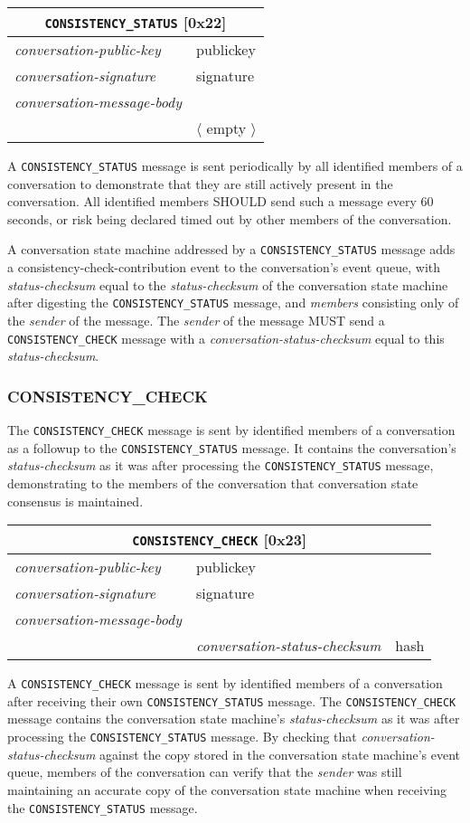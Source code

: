 \documentclass{article}
\def\message#1{\texttt{#1}}
\def\field#1{\textit{#1}}
\def\smfield#1{\textsl{#1}}
\def\type#1{\textsf{#1}}
\newenvironment{conversationmessage}[2]{
\newcommand{\messagefield}[2]{
& \field{##1} & \type{##2} \\
\hline
}
\hspace{2em minus 2em}\begin{tabular}{|l|l|l|}
\hline
\multicolumn{3}{|c|}{\message{#1} [#2]} \\
\hline
\hline
\field{conversation-public-key} & \multicolumn{2}{l|}{\type{publickey}} \\
\hline
\field{conversation-signature} & \multicolumn{2}{l|}{\type{signature}} \\
\hline
\field{conversation-message-body} & \multicolumn{2}{l|}{} \\
\hline
}{
\end{tabular}
}
\newcommand\emptyconversationmessage[2]{
\begin{conversationmessage}{#1}{#2}
& \multicolumn{2}{|l|}{ $\langle$ empty $\rangle$ } \\
\hline
\end{conversationmessage}
}
\begin{document}
\emptyconversationmessage{CONSISTENCY\_STATUS}{0x22}

A \message{CONSISTENCY\_STATUS} message is sent periodically by all identified members of a conversation to demonstrate that they are still actively present in the conversation.
All identified members SHOULD send such a message every 60 seconds, or risk being declared timed out by other members of the conversation.

A conversation state machine addressed by a \message{CONSISTENCY\_STATUS} message adds a \type{consistency-check-contribution} event to the conversation's event queue, with \smfield{status-checksum} equal to the \smfield{status-checksum} of the conversation state machine after digesting the \message{CONSISTENCY\_STATUS} message, and \smfield{members} consisting only of the \field{sender} of the message.
The \field{sender} of the message MUST send a \message{CONSISTENCY\_CHECK} message with a \field{conversation-status-checksum} equal to this \smfield{status-checksum}.


\subsubsection{CONSISTENCY\_CHECK}
\label{sec:messages/consistency-check}

The \message{CONSISTENCY\_CHECK} message is sent by identified members of a conversation as a followup to the \message{CONSISTENCY\_STATUS} message.
It contains the conversation's \smfield{status-checksum} as it was after processing the \message{CONSISTENCY\_STATUS} message, demonstrating to the members of the conversation that conversation state consensus is maintained.

\begin{conversationmessage}{CONSISTENCY\_CHECK}{0x23}
\messagefield{conversation-status-checksum}{hash}
\end{conversationmessage}

A \message{CONSISTENCY\_CHECK} message is sent by identified members of a conversation after receiving their own \message{CONSISTENCY\_STATUS} message.
The \message{CONSISTENCY\_CHECK} message contains the conversation state machine's \smfield{status-checksum} as it was after processing the \message{CONSISTENCY\_STATUS} message.
By checking that \field{conversation-status-checksum} against the copy stored in the conversation state machine's event queue, members of the conversation can verify that the \field{sender} was still maintaining an accurate copy of the conversation state machine when receiving the \message{CONSISTENCY\_STATUS} message.
\end{document}
